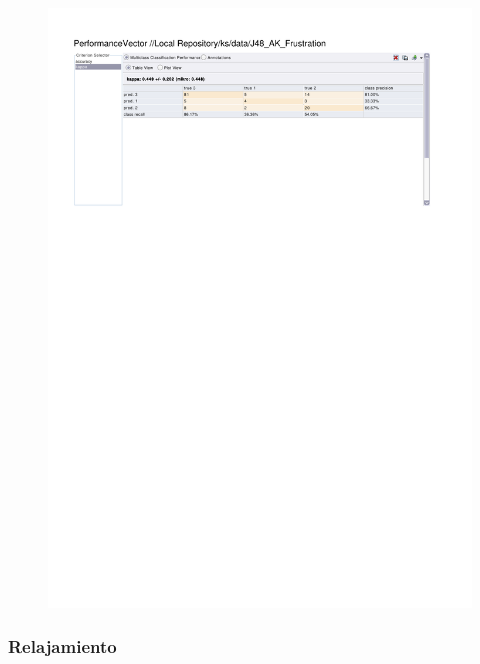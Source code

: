 \begin{figure}[htp]
  \centerline{\includegraphics[trim=0 680 0 60,clip,width=16.09cm]{results/J48_K_Frustration.pdf}} \caption{
} \label{J48_K_Frustration}
\end{figure}

\clearpage
\FloatBarrier
\subsubsection{Relajamiento}

